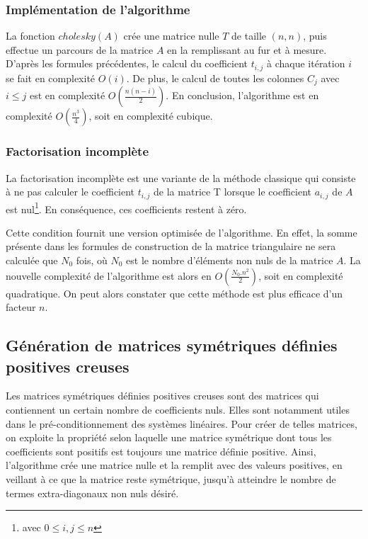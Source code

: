\documentclass[a4paper]{article}
\begin{document}
\subsubsection{Implémentation de l'algorithme}

La fonction $cholesky(A)$ crée une matrice nulle $T$ de taille $(n,n)$, puis effectue un parcours de la matrice $A$ en la remplissant au fur et à mesure. D'après les formules précédentes, le calcul du coefficient $t_{i,j}$ à chaque itération $i$ se fait en complexité $O(i)$. De plus, le calcul de toutes les colonnes $C_{j}$ avec $i\leq j$ est en complexité $O(\frac{n(n-i)}{2})$. En conclusion, l'algorithme est en complexité $O(\frac{n^{3}}{4})$, soit en complexité cubique.

\subsubsection{Factorisation incomplète}

La factorisation incomplète est une variante de la méthode classique qui consiste à ne pas calculer le coefficient $t_{i,j}$ de la matrice T lorsque le coefficient $a_{i,j}$ de $A$ est nul\footnote{avec $ 0\leq i,j\leq n$}. En conséquence, ces coefficients restent à zéro.

Cette condition fournit une version optimisée de l'algorithme. En effet, la somme présente dans les formules de construction de la matrice triangulaire ne sera calculée que $N_{0}$ fois, où $N_{0}$ est le nombre d'éléments non nuls de la matrice $A$. La nouvelle complexité de l'algorithme est alors en $O(\frac{N_{0}. n^{2}}{2})$, soit en complexité quadratique. On peut alors constater que cette méthode est plus efficace d'un facteur $n$.

\subsection{Génération de matrices symétriques définies positives creuses}

Les matrices symétriques définies positives creuses sont des matrices qui contiennent un certain nombre de coefficients nuls. Elles sont notamment utiles dans le pré-conditionnement des systèmes linéaires. Pour créer de telles matrices, on exploite la propriété selon laquelle une matrice symétrique dont tous les coefficients sont positifs est toujours une matrice définie positive. Ainsi, l'algorithme crée une matrice nulle et la remplit avec des valeurs positives, en veillant à ce que la matrice reste symétrique, jusqu'à atteindre le nombre de termes extra-diagonaux non nuls désiré.
\end{document}
